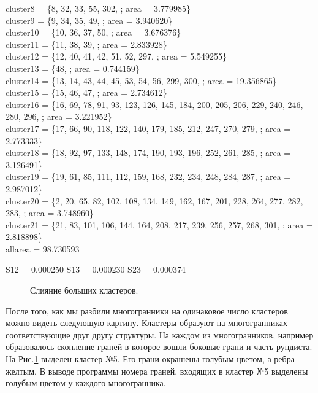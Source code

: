 \documentclass[a4paper,12pt, titlepage]{article}
\begin{document}
cluster8 = \{8, 32, 33, 55, 302, ; area = 3.779985\}\\
cluster9 = \{9, 34, 35, 49, ; area = 3.940620\}\\
cluster10 = \{10, 36, 37, 50, ; area = 3.676376\}\\
cluster11 = \{11, 38, 39, ; area = 2.833928\}\\
cluster12 = \{12, 40, 41, 42, 51, 52, 297, ; area = 5.549255\}\\
cluster13 = \{48, ; area = 0.744159\}\\
cluster14 = \{13, 14, 43, 44, 45, 53, 54, 56, 299, 300, ; area = 19.356865\}\\
cluster15 = \{15, 46, 47, ; area = 2.734612\}\\
cluster16 = \{16, 69, 78, 91, 93, 123, 126, 145, 184, 200, 205, 206, 229, 240, 246, 280, 296, ; area = 3.221952\}\\
cluster17 = \{17, 66, 90, 118, 122, 140, 179, 185, 212, 247, 270, 279, ; area = 2.773333\}\\
cluster18 = \{18, 92, 97, 133, 148, 174, 190, 193, 196, 252, 261, 285, ; area = 3.126491\}\\
cluster19 = \{19, 61, 85, 111, 112, 159, 168, 232, 234, 248, 284, 287, ; area = 2.987012\}\\
cluster20 = \{2, 20, 65, 82, 102, 108, 134, 149, 162, 167, 201, 228, 264, 277, 282, 283, ; area = 3.748960\}\\
cluster21 = \{21, 83, 101, 106, 144, 164, 208, 217, 239, 256, 257, 268, 301, ; area = 2.818898\}\\
allarea = 98.730593
\begin{center}
S12 = 0.000250\;\;\;\;\;
S13 = 0.000230\;\;\;\;\;
S23 = 0.000374
\end{center}
\begin{figure}[h]
\noindent{}
\caption{Слияние больших кластеров.}
\label{rund}
\end{figure}
\newpage



После того, как мы разбили многогранники на одинаковое число кластеров можно видеть следующую картину. 
Кластеры образуют на многогранниках соответствующие друг другу структуры. На каждом из многогранников,
например образовалось скопление граней в  которое вошли боковые грани и часть рундиста. На Рис.\ref{rund}
выделен кластер №5. Его грани окрашены голубым цветом, а ребра желтым. В выводе программы 
номера граней, входящих в кластер №5 выделены голубым цветом у каждого многогранника. 
\end{document}
